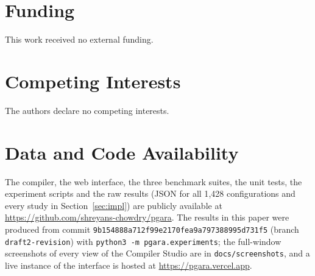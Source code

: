 \documentclass{ieeeaccess}
\begin{document}
\section*{Funding}
This work received no external funding.

\section*{Competing Interests}
The authors declare no competing interests.

\section*{Data and Code Availability}
The compiler, the web interface, the three benchmark suites, the unit
tests, the experiment scripts and the raw results (JSON for all 1{,}428
configurations and every study in Section~\ref{sec:impl}) are publicly
available at \url{https://github.com/shreyans-chowdry/pgara}. The
results in this paper were produced from commit
\texttt{9b154888a712\allowbreak f99e2170fe\allowbreak a9a797388995\allowbreak d731f5}
(branch \texttt{draft2-revision}) with \texttt{python3 -m pgara.experiments};
the full-window screenshots of every view of the Compiler Studio are in
\texttt{docs/screenshots}, and a live instance of the interface is
hosted at \url{https://pgara.vercel.app}.
\end{document}
